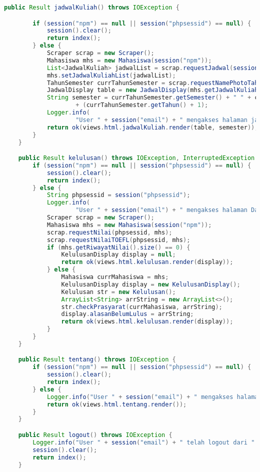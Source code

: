 \begin{lstlisting}[language=Java,basicstyle=\tiny,caption=Applicstion.java]
	public Result jadwalKuliah() throws IOException {

		if (session("npm") == null || session("phpsessid") == null) {
			session().clear();
			return index();
		} else {
			Scraper scrap = new Scraper();
			Mahasiswa mhs = new Mahasiswa(session("npm"));
			List<JadwalKuliah> jadwalList = scrap.requestJadwal(session("phpsessid"));
			mhs.setJadwalKuliahList(jadwalList);
			TahunSemester currTahunSemester = scrap.requestNamePhotoTahunSemester(session("phpsessid"), mhs);
			JadwalDisplay table = new JadwalDisplay(mhs.getJadwalKuliahList());
			String semester = currTahunSemester.getSemester() + " " + currTahunSemester.getTahun() + "/"
					+ (currTahunSemester.getTahun() + 1);
			Logger.info(
					"User " + session("email") + " mengakses halaman jadwal kuliah dari " + request().remoteAddress());
			return ok(views.html.jadwalKuliah.render(table, semester));
		}
	}

	public Result kelulusan() throws IOException, InterruptedException {
		if (session("npm") == null || session("phpsessid") == null) {
			session().clear();
			return index();
		} else {
			String phpsessid = session("phpsessid"); 
			Logger.info(
					"User " + session("email") + " mengakses halaman Data akademik dari " + request().remoteAddress());
			Scraper scrap = new Scraper();
			Mahasiswa mhs = new Mahasiswa(session("npm"));
			scrap.requestNilai(phpsessid, mhs);
			scrap.requestNilaiTOEFL(phpsessid, mhs);
			if (mhs.getRiwayatNilai().size() == 0) {
				KelulusanDisplay display = null;
				return ok(views.html.kelulusan.render(display));
			} else {
				Mahasiswa currMahasiswa = mhs;
				KelulusanDisplay display = new KelulusanDisplay();
				Kelulusan str = new Kelulusan();
				ArrayList<String> arrString = new ArrayList<>();
				str.checkPrasyarat(currMahasiswa, arrString);
				display.alasanBelumLulus = arrString;
				return ok(views.html.kelulusan.render(display));
			}
		}
	}

	public Result tentang() throws IOException {
		if (session("npm") == null || session("phpsessid") == null) {
			session().clear();
			return index();
		} else {
			Logger.info("User " + session("email") + " mengakses halaman info dari " + request().remoteAddress());
			return ok(views.html.tentang.render());
		}
	}

	public Result logout() throws IOException {
		Logger.info("User " + session("email") + " telah logout dari " + request().remoteAddress());
		session().clear();
		return index();
	}


\end{lstlisting}
